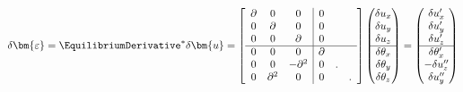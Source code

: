 $$
\delta \bm{\varepsilon} 
= \EquilibriumDerivative^* \delta \bm{u}
= \left[\begin{array}{ccc|ccc}
\partial & 0 & 0 & 0 \\
0 & \partial & 0 & 0 \\
0 & 0 & \partial & 0 \\ \hline
0 & 0 & 0 & \partial & & \\
0 & 0 & -\partial^2 & 0 & . \\
0 & \partial^2 & 0 & 0 & & . \\
\end{array}\right]\begin{pmatrix}
\delta u_x \\
\delta u_y \\
\delta u_z \\ \hline
\delta \theta_x \\ 
\delta \theta_y \\
\delta \theta_z \\
\end{pmatrix}
= \begin{pmatrix}
 \delta  u_x^{\prime} \\ 
 \delta  u_y^{\prime} \\ 
 \delta  u_z^{\prime} \\ \hline
 \delta  \theta_x^{\prime} \\
-\delta  u_z^{\prime\prime} \\ 
 \delta  u_y^{\prime\prime} \\ 
\end{pmatrix}
$$


